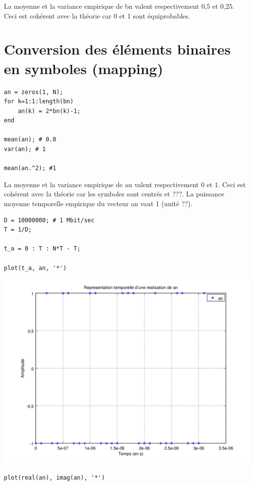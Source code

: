 \documentclass{acm_proc_article-sp}
\begin{document}
La moyenne et la variance empirique de bn valent respectivement 0,5 et 0,25. Ceci est cohérent avec la théorie car 0 et 1 sont équiprobables.


\section{Conversion des éléments binaires en symboles (mapping)}
\begin{lstlisting}
an = zeros(1, N);
for k=1:1:length(bn)
    an(k) = 2*bn(k)-1;
end

mean(an); # 0.0
var(an); # 1

mean(an.^2); #1
\end{lstlisting}

La moyenne et la variance empirique de an valent respectivement 0 et 1. Ceci est cohérent avec la théorie car les symboles sont centrés et ???.
La puissance moyenne temporelle empirique du vecteur an vaut 1 (unité ??).

\begin{lstlisting}
D = 10000000; # 1 Mbit/sec
T = 1/D;

t_a = 0 : T : N*T - T;

plot(t_a, an, '*')
\end{lstlisting}

\begin{center}
\includegraphics[scale=0.45]{ak_2.png}
\end{center}

\begin{lstlisting}
plot(real(an), imag(an), '*')
\end{lstlisting}
\end{document}
